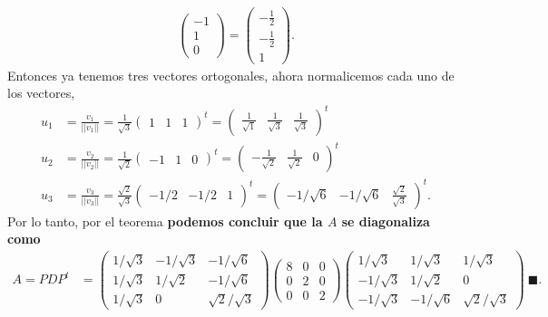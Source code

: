 \documentclass[11pt,letterpaper]{article}
\newcommand{\finf}{\blacksquare.}
\begin{document}
\begin{enumerate}
\begin{align*}
\begin{pmatrix}
-1\\1 \\0
\end{pmatrix}= \begin{pmatrix}
-\frac{1}{2}\\ -\frac{1}{2}\\ 1
\end{pmatrix}.
\end{align*}
Entonces ya tenemos tres vectores ortogonales, ahora normalicemos cada uno de los vectores, 
\begin{align*}
u_1&= \frac{v_1}{||v_1||} =\frac{1}{\sqrt{3}} \begin{pmatrix}
1 & 1 & 1
\end{pmatrix}^t = \begin{pmatrix}
 \frac{1}{\sqrt{1}} & \frac{1}{\sqrt{3}} & \frac{1}{\sqrt{3}}
\end{pmatrix}^t\\
u_2&= \frac{v_2}{||v_2||} =\frac{1}{\sqrt{2}} \begin{pmatrix}
-1 & 1 & 0
\end{pmatrix}^t = \begin{pmatrix}
-\frac{1}{\sqrt{2}} & \frac{1}{\sqrt{2}} & 0
\end{pmatrix}^t\\
u_3&= \frac{v_3}{||v_3||} =\frac{\sqrt{2}}{\sqrt{3}} \begin{pmatrix}
-1/2 & -1/2 & 1
\end{pmatrix}^t = \begin{pmatrix}
-1/\sqrt{6} & -1/\sqrt{6} & \frac{\sqrt{2}}{\sqrt{3}}
\end{pmatrix}^t.
\end{align*}
Por lo tanto, por el teorema  \textbf{podemos concluir que la $A$ se diagonaliza  como}
\begin{align*}
A=PDP^{t}&= \begin{pmatrix}
1/\sqrt{3} & -1/\sqrt{3} & -1/\sqrt{6}\\
1/\sqrt{3} & 1/\sqrt{2} & -1/\sqrt{6}\\
1/\sqrt{3} & 0 & \sqrt{2}/ \sqrt{3}
\end{pmatrix} \begin{pmatrix}
8 & 0 & 0\\
0 & 2 & 0\\
0 & 0 & 2
\end{pmatrix} \begin{pmatrix}
1/\sqrt{3} & 1/\sqrt{3} & 1/\sqrt{3}\\
-1/\sqrt{3} & 1/\sqrt{2} & 0\\
-1/\sqrt{3} & -1/\sqrt{6} & \sqrt{2}/ \sqrt{3}
\end{pmatrix} \ \finf
\end{align*}


\end{enumerate}
\end{document}
